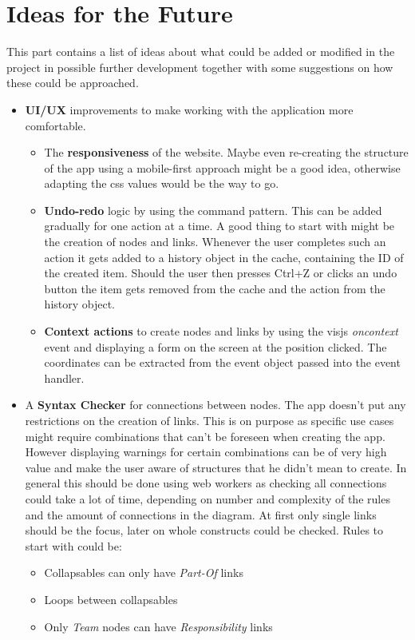\chapter{Ideas for the Future}
\label{chap:Future}
This part contains a list of ideas about what could be added or modified in the project in possible further development together with some suggestions on how these could be approached.
\begin{itemize}
\item \textbf{UI/UX} improvements to make working with the application more comfortable.
\begin{itemize}
\item The \textbf{responsiveness} of the website. Maybe even re-creating the structure of the app using a mobile-first approach might be a good idea, otherwise adapting the css values would be the way to go.

\item \textbf{Undo-redo} logic by using the command pattern. This can be added gradually for one action at a time. A good thing to start with might be the creation of nodes and links. Whenever the user completes such an action it gets added to a history object in the cache, containing the ID of the created item. Should the user then presses Ctrl+Z or clicks an undo button the item gets removed from the cache and the action from the history object.

\item \textbf{Context actions} to create nodes and links by using the visjs \emph{oncontext} event and displaying a form on the screen at the position clicked. The coordinates can be extracted from the event object passed into the event handler.
\end{itemize}

\item A \textbf{Syntax Checker} for connections between nodes. The app doesn't put any restrictions on the creation of links. This is on purpose as specific use cases might require combinations that can't be foreseen when creating the app. However displaying warnings for certain combinations can be of very high value and make the user aware of structures that he didn't mean to create. In general this should be done using web workers as checking all connections could take a lot of time, depending on number and complexity of the rules and the amount of connections in the diagram. At first only single links should be the focus, later on whole constructs could be checked. Rules to start with could be:
\begin{itemize}
\item Collapsables can only have \emph{Part-Of} links
\item Loops between collapsables
\item Only \emph{Team} nodes can have \emph{Responsibility} links
\end{itemize}


\end{itemize}
